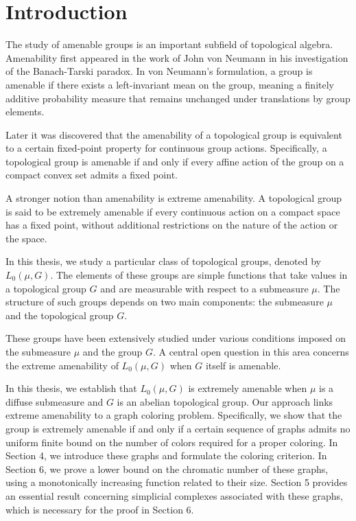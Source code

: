\section{Introduction}
The study of amenable groups is an important subfield of topological algebra. Amenability first appeared in the work of John von Neumann \cite{vonNeumann1929} in his investigation of the Banach-Tarski paradox. In von Neumann’s formulation, a group is amenable if there exists a left-invariant mean on the group, meaning a finitely additive probability measure that remains unchanged under translations by group elements.

Later it was discovered that the amenability of a topological group is equivalent to a certain fixed-point property for continuous group actions. Specifically, a topological group is amenable if and only if every affine action of the group on a compact convex set admits a fixed point.

A stronger notion than amenability is extreme amenability. A topological group is said to be extremely amenable if every continuous action on a compact space has a fixed point, without additional restrictions on the nature of the action or the space.

In this thesis, we study a particular class of topological groups, denoted by $L_0(\mu, G)$. The elements of these groups are simple functions that take values in a topological group $G$ and are measurable with respect to a submeasure $\mu$. The structure of such groups depends on two main components: the submeasure $\mu$ and the topological group $G$.

These groups have been extensively studied under various conditions imposed on the submeasure $\mu$ and the group $G$. A central open question in this area concerns the extreme amenability of $L_0(\mu, G)$ when $G$ itself is amenable.

In this thesis, we establish that $L_0(\mu, G)$ is extremely amenable when $\mu$ is a diffuse submeasure and $G$ is an abelian topological group. Our approach links extreme amenability to a graph coloring problem. Specifically, we show that the group is extremely amenable if and only if a certain sequence of graphs admits no uniform finite bound on the number of colors required for a proper coloring. In Section 4, we introduce these graphs and formulate the coloring criterion. In Section 6, we prove a lower bound on the chromatic number of these graphs, using a monotonically increasing function related to their size. Section 5 provides an essential result concerning simplicial complexes associated with these graphs, which is necessary for the proof in Section 6.


